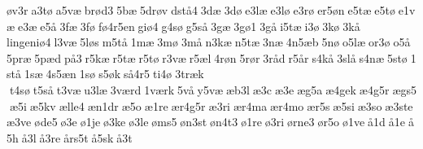 øv3r a3tø a5væ brød3 5bæ 5drøv dstå4 3dæ 3dø e3læ e3lø e3rø er5øn e5tæ e5tø e1væ e3æ e5å 3fæ 3fø fø4r5en giø4 g4sø g5så 3gæ 3gø1 3gå i5tæ i3ø 3kø 3kå 
lingeniø4 l3væ 5løs m5tå 1mæ 3mø 3må n3kæ n5tæ 3næ 4n5æb 5nø o5læ or3ø o5å 5præ 5pæd på3 r5kæ r5tæ r5tø r3væ r5æl 4røn 5rør 3råd r5år s4kå 3slå s4næ 5stø 1stå 1sæ 4s5æn 1sø s5øk så4r5 ti4ø 3træk  t4sø t5så t3væ u3læ 3værd 1værk 5vå y5væ æb3l æ3c æ3e æg5a æ4gek æ4g5r ægs5 æ5i æ5kv ælle4 æn1dr æ5o æ1re ær4g5r æ3ri ær4ma ær4mo ær5s æ5si æ3so æ3ste æ3ve øde5 ø3e ø1je ø3ke ø3le øms5 øn3st øn4t3 ø1re ø3ri ørne3 ør5o ø1ve å1d å1e å5h å3l å3re års5t å5sk å3t